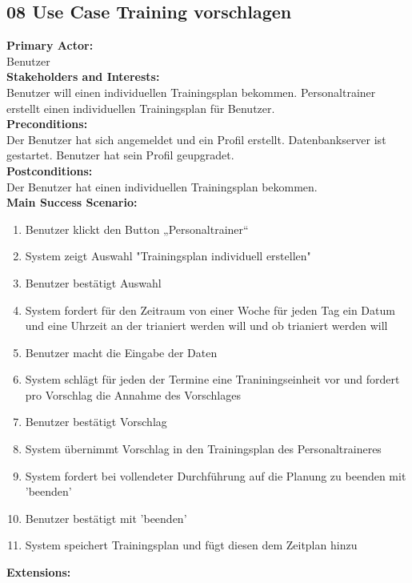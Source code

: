 \documentclass[12pt,a4paper,onecolumn]{article}
\begin{document}
\subsection{08 Use Case Training vorschlagen}
\textbf{Primary Actor:}\\ Benutzer\\
\textbf{Stakeholders and Interests:}\\
Benutzer will einen individuellen \gls{Trainingsplan} bekommen. \gls{Personaltrainer} erstellt einen individuellen \gls{Trainingsplan} für Benutzer.\\
\textbf{Preconditions:} \\ Der Benutzer hat sich angemeldet und ein Profil erstellt. Datenbankserver ist gestartet. Benutzer hat sein Profil geupgradet.\\
\textbf{Postconditions:}\\Der Benutzer hat einen individuellen \gls{Trainingsplan} bekommen.\\
\textbf{Main Success Scenario:}
\begin{enumerate}
    \item Benutzer klickt den Button „Personaltrainer“
    \item System zeigt Auswahl "Trainingsplan individuell erstellen"
    \item Benutzer bestätigt Auswahl
    \item System fordert für den Zeitraum von einer Woche für jeden Tag ein Datum und eine Uhrzeit an der trianiert werden will und ob trianiert werden will
    \item Benutzer macht die Eingabe der Daten
    \item System schlägt für jeden der Termine eine Traniningseinheit vor und fordert pro Vorschlag die Annahme des Vorschlages
    \item Benutzer bestätigt Vorschlag
    \item System übernimmt Vorschlag in den \gls{Trainingsplan} des \gls{Personaltrainer}es
    \item System fordert bei vollendeter Durchführung auf die Planung zu beenden mit 'beenden'
    \item Benutzer bestätigt mit 'beenden'
    \item System speichert \gls{Trainingsplan} und fügt diesen dem \gls{Zeitplan} hinzu
\end{enumerate} 
\textbf{Extensions:}\\
\end{document}
